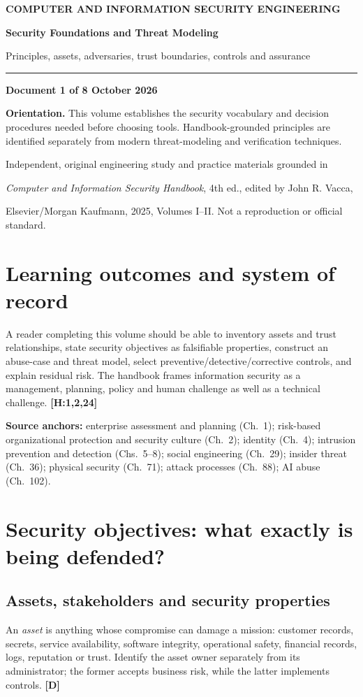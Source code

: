 \documentclass[10pt,letterpaper,oneside]{article}
\newcommand{\handbookref}[1]{\textsf{\color{accent}\textbf{[H:#1]}}}
\newcommand{\designed}{\textsf{\color{accent}\textbf{[D]}}}
\newcommand{\makereportcover}[4]{%
\hypersetup{pageanchor=false}%

\thispagestyle{empty}\vspace*{1.15in}
{\small\bfseries\color{accent} COMPUTER AND INFORMATION SECURITY ENGINEERING}\par\vspace{13pt}
{\Huge\bfseries\color{ink} #1\par}\vspace{15pt}
{\Large\color{muted} #2\par}\vspace{18pt}
\color{accent}\rule{0.94\textwidth}{2.1pt}\par\vspace{20pt}
{\normalsize\bfseries Document #3 of 8 \quad\textbullet\quad 16 October 2026\par}
\vspace{0.35in}
\begin{sourcebox}\textbf{Orientation.} #4\end{sourcebox}
\vfill
{\small\color{muted} Independent, original engineering study and practice materials grounded in\par
\emph{Computer and Information Security Handbook}, 4th ed., edited by John R. Vacca,\par
Elsevier/Morgan Kaufmann, 2025, Volumes I--II. Not a reproduction or official standard.}
\newpage\hypersetup{pageanchor=true}\setcounter{page}{1}\tableofcontents\newpage
}
\begin{document}
\makereportcover{Security Foundations and Threat Modeling}{Principles, assets, adversaries, trust boundaries, controls and assurance}{1}{This volume establishes the security vocabulary and decision procedures needed before choosing tools. Handbook-grounded principles are identified separately from modern threat-modeling and verification techniques.}

\section{Learning outcomes and system of record}
A reader completing this volume should be able to inventory assets and trust relationships, state security objectives as falsifiable properties, construct an abuse-case and threat model, select preventive/detective/corrective controls, and explain residual risk. The handbook frames information security as a management, planning, policy and human challenge as well as a technical challenge. \handbookref{1,2,24}
\begin{sourcebox}\textbf{Source anchors:} enterprise assessment and planning (Ch.~1); risk-based organizational protection and security culture (Ch.~2); identity (Ch.~4); intrusion prevention and detection (Chs.~5--8); social engineering (Ch.~29); insider threat (Ch.~36); physical security (Ch.~71); attack processes (Ch.~88); AI abuse (Ch.~102).\end{sourcebox}

\section{Security objectives: what exactly is being defended?}
\subsection{Assets, stakeholders and security properties}
An \emph{asset} is anything whose compromise can damage a mission: customer records, secrets, service availability, software integrity, operational safety, financial records, logs, reputation or trust. Identify the asset owner separately from its administrator; the former accepts business risk, while the latter implements controls. \designed{}
\end{document}
